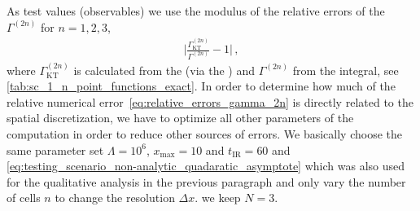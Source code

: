 As test values (observables) we use the modulus of the relative errors of the \ipi{} \nptFunctions{} $\Gamma^{(2n)}$ for $n = 1, 2, 3$,
\begin{align}
	\bigg| \frac{\Gamma^{(2n)}_\mathrm{KT}}{\Gamma^{(2n)}} - 1 \bigg| \, ,	\label{eq:relative_errors_gamma_2n}
\end{align}
where $\Gamma^{(2n)}_\mathrm{KT}$ is calculated from the \frg{} (via the \ktScheme{}) and $\Gamma^{(2n)}$ from the integral, see \cref{tab:sc_1_n_point_functions_exact}.
In order to determine how much of the relative numerical error~\eqref{eq:relative_errors_gamma_2n} is directly related to the spatial discretization, we have to optimize all other parameters of the computation in order to reduce other sources of errors.
We basically choose the same parameter set \dash{} \viz{} $\Lambda = 10^6$, $x_\mathrm{max} = 10$ and $t_\mathrm{IR} = 60$ \dash{} and \uv{} \ic{} \eqref{eq:testing_scenario_non-analytic_quadaratic_asymptote} which was also used for the qualitative analysis in the previous paragraph and only vary the number of cells $n$ to change the resolution $\Delta x$.
\WlogA{} we keep $N=3$.

